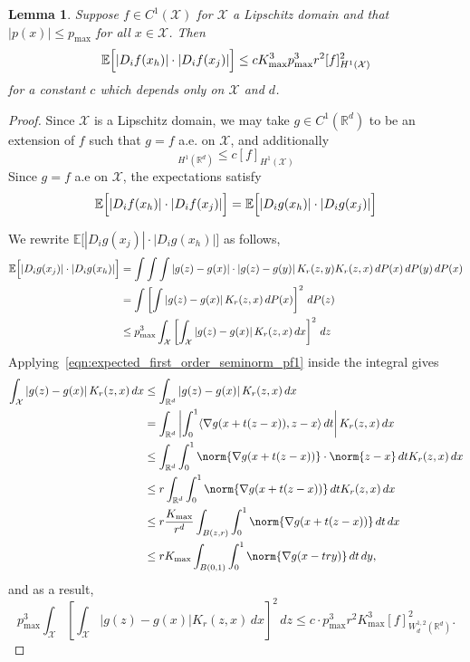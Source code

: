 \documentclass{article}
\newcommand{\Reals}{\mathbb{R}}
\newcommand{\abs}[1]{\left \lvert #1 \right \rvert}
\newcommand{\1}{\mathbf{1}}
\newcommand{\Rd}{\Reals^d}
\newcommand{\Xset}{\mathcal{X}}
\newcommand{\Ebb}{\mathbb{E}}
\newcommand{\dotp}[2]{\langle #1, #2 \rangle}
\theoremstyle{alden}
\theoremstyle{aldenthm}
\newtheorem{lemma}{Lemma}
\theoremstyle{definition}
\theoremstyle{remark}
\begin{document}
\begin{lemma}
	\label{lem:expected_first_order_seminorm_2}
	Suppose $f \in C^{1}(\Xset)$ for $\Xset$ a Lipschitz domain and that $\abs{p(x)} \leq p_{\max}$ for all $x \in \Xset$. Then
	\begin{equation*}
	\Ebb\Bigl[\abs{D_if(x_h)}\cdot\abs{D_if(x_j)} \Bigr] \leq c K_{\max}^3 p_{\max}^3 r^2 [f]_{H^1(\Xset)}^2
	\end{equation*}
	for a constant $c$ which depends only on $\Xset$ and $d$.
\end{lemma}
\begin{proof}
	Since $\Xset$ is a Lipschitz domain, we may take $g \in C^1(\Rd)$ to be an extension of $f$ such that $g = f$ a.e. on $\Xset$, and additionally
	\begin{equation*}
	[g]_{H^1(\Rd)} \leq c[f]_{H^1(\Xset)}
	\end{equation*}
	Since $g = f$ a.e on $\Xset$, the expectations satisfy
	\begin{equation*}
	\Ebb\Bigl[\abs{D_if(x_h)}\cdot\abs{D_if(x_j)} \Bigr] =\Ebb\Bigl[\abs{D_ig(x_h)}\cdot\abs{D_ig(x_j)} \Bigr]
	\end{equation*}
	
	We rewrite $\Ebb\bigl[\abs{D_{i}g(x_j)} \cdot \abs{D_ig(x_h)} \bigr]$ as follows,
	\begin{align*}
	\Ebb\Bigl[\abs{D_{i}g(x_j)} \cdot \abs{D_ig(x_h)} \Bigr] & = \int \int \int \abs{g(z) - g(x)} \cdot \abs{g(z) - g(y)} K_r(z,y) K_r(z,x) \,dP(x) \,dP(y) \,dP(x) \\
	& = \int \left[\int \abs{g(z) - g(x)} K_r(z,x) \,dP(x)\right]^2 \,dP(z) \\
	& \leq p_{\max}^3 \int_{\Xset} \left[\int_{\Xset} \abs{g(z) - g(x)} K_r(z,x) \,dx\right]^2 \,dz
	\end{align*}
	Applying~\eqref{eqn:expected_first_order_seminorm_pf1} inside the integral gives
	\begin{align*}
	\int_{\Xset} \abs{g(z) - g(x)} K_r(z,x) \,dx & \leq \int_{\Rd} \abs{g(z) - g(x)} K_r(z,x) \,dx \\
	& = \int_{\Rd} \abs{\int_{0}^{1} \dotp{\nabla g(x + t(z - x))}{z - x} \,dt} K_r(z,x) \,dx \\
	& \leq \int_{\Rd} \int_{0}^{1} \norm{\nabla g(x + t(z - x))}\cdot\norm{z - x} \,dt K_r(z,x) \,dx \\
	& \leq r \int_{\Rd} \int_{0}^{1} \norm{\nabla g(x + t(z - x))} \,dt K_r(z,x) \,dx \\
	& \leq r \frac{K_{\max}}{r^d} \int_{B(z,r)} \int_{0}^{1} \norm{\nabla g(x + t(z - x))} \,dt  \,dx \\
	& \leq r K_{\max} \int_{B(0,1)} \int_{0}^{1} \norm{\nabla g(x - try)} \,dt  \,dy,
	\end{align*}
	and as a result, 
	\begin{equation*}
	p_{\max}^3 \int_{\Xset} \left[\int_{\Xset} \abs{g(z) - g(x)} K_r(z,x) \,dx\right]^2 \,dz \leq c\cdot p_{\max}^3 r^2 K_{\max}^3 [f]_{W_d^{1,2}(\Rd)}^2.
	\end{equation*}
\end{proof}
\end{document}
